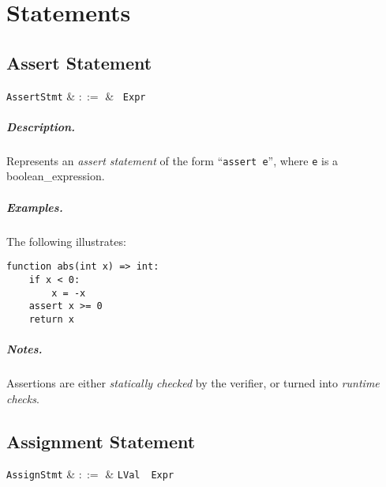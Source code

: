 \chapter{Statements}


\section{Assert Statement}

\begin{syntax}
  \verb+AssertStmt+ & $::=$ & \ \verb+Expr+\\
\end{syntax}

\paragraph{Description.}  Represents an {\em assert statement} of the form
``\lstinline{assert e}'', where \lstinline{e} is a \gls{boolean_expression}. 

\paragraph{Examples.} The following illustrates:
\begin{lstlisting}
function abs(int x) => int:
    if x < 0:
        x = -x
    assert x >= 0
    return x
\end{lstlisting}

\paragraph{Notes.}  Assertions are either {\em statically checked} by the
verifier, or turned into {\em runtime checks}.



\section{Assignment Statement}

\begin{syntax}
  \verb+AssignStmt+ & $::=$ & \verb+LVal+\ \token{=}\ \verb+Expr+\\
\end{syntax}

